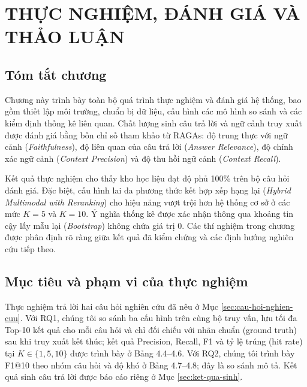 \chapter{THỰC NGHIỆM, ĐÁNH GIÁ VÀ THẢO LUẬN}
\label{Chapter4}

\section*{Tóm tắt chương}

Chương này trình bày toàn bộ quá trình thực nghiệm và đánh giá hệ thống, bao gồm thiết lập môi trường, chuẩn bị dữ liệu, cấu hình các mô hình so sánh và các kiểm định thống kê liên quan. Chất lượng sinh câu trả lời và ngữ cảnh truy xuất được đánh giá bằng bốn chỉ số tham khảo từ RAGAs: độ trung thực với ngữ cảnh (\textit{Faithfulness}), độ liên quan của câu trả lời (\textit{Answer Relevance}), độ chính xác ngữ cảnh (\textit{Context Precision}) và độ thu hồi ngữ cảnh (\textit{Context Recall}).

Kết quả thực nghiệm cho thấy kho học liệu đạt độ phủ 100\% trên bộ câu hỏi đánh giá. Đặc biệt, cấu hình lai đa phương thức kết hợp xếp hạng lại (\textit{Hybrid Multimodal with Reranking}) cho hiệu năng vượt trội hơn hệ thống cơ sở ở các mức $K = 5$ và $K = 10$. Ý nghĩa thống kê được xác nhận thông qua khoảng tin cậy lấy mẫu lại (\textit{Bootstrap}) không chứa giá trị 0. Các thí nghiệm trong chương được phân định rõ ràng giữa kết quả đã kiểm chứng và các định hướng nghiên cứu tiếp theo.


\section{Mục tiêu và phạm vi của thực nghiệm}

Thực nghiệm trả lời hai câu hỏi nghiên cứu đã nêu ở Mục \ref{sec:cau-hoi-nghien-cuu}. Với RQ1, chúng tôi so sánh ba cấu hình trên cùng bộ truy vấn, lưu tối đa Top-10 kết quả cho mỗi câu hỏi và chỉ đối chiếu với nhãn chuẩn (ground truth) sau khi truy xuất kết thúc; kết quả Precision, Recall, F1 và tỷ lệ trúng (hit rate) tại $K \in \{1,5,10\}$ được trình bày ở Bảng 4.4--4.6. Với RQ2, chúng tôi trình bày F1@10 theo nhóm câu hỏi và độ khó ở Bảng 4.7--4.8; đây là so sánh mô tả. Kết quả sinh câu trả lời được báo cáo riêng ở Mục \ref{sec:ket-qua-sinh}.


